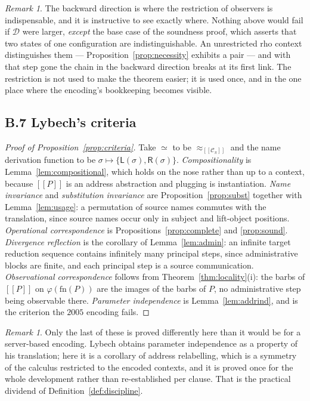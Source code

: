 \documentclass[11pt]{article}
\theoremstyle{definition}
\theoremstyle{plain}
\theoremstyle{remark}
\newtheorem{remark}[definition]{Remark}
\newcommand{\enc}[1]{[\![#1]\!]}
\newcommand{\Lft}{\mathsf{L}}
\newcommand{\Rgt}{\mathsf{R}}
\newcommand{\Ctx}{\mathscr{C}}
\newcommand{\Obs}{\mathcal{D}}
\newcommand{\bisim}{\approx}
\newcommand{\fn}{\mathrm{fn}}
\begin{document}
\begin{remark}
The backward direction is where the restriction of observers is
indispensable, and it is instructive to see exactly where. Nothing above
would fail if $\Obs$ were larger, \emph{except} the base case of the
soundness proof, which asserts that two states of one configuration are
indistinguishable. An unrestricted rho context distinguishes them ---
Proposition~\ref{prop:necessity} exhibits a pair --- and with that step
gone the chain in the backward direction breaks at its first link. The
restriction is not used to make the theorem easier; it is used once, and
in the one place where the encoding's bookkeeping becomes visible.
\end{remark}

\subsection{B.7 Lybech's criteria}

\begin{proof}[Proof of Proposition~\ref{prop:criteria}]
Take $\simeq$ to be $\bisim_{\enc{\Ctx_\pi}}$ and the name derivation
function to be $\sigma \mapsto \{\Lft(\sigma),\Rgt(\sigma)\}$.
\emph{Compositionality} is Lemma~\ref{lem:compositional}, which holds on
the nose rather than up to a context, because $\enc{P}$ is an address
abstraction and plugging is instantiation.
\emph{Name invariance} and \emph{substitution invariance} are
Proposition~\ref{prop:subst} together with Lemma~\ref{lem:usage}: a
permutation of source names commutes with the translation, since source
names occur only in subject and lift-object positions.
\emph{Operational correspondence} is
Propositions~\ref{prop:complete} and \ref{prop:sound}.
\emph{Divergence reflection} is the corollary of
Lemma~\ref{lem:admin}: an infinite target reduction sequence contains
infinitely many principal steps, since administrative blocks are finite,
and each principal step is a source communication.
\emph{Observational correspondence} follows from
Theorem~\ref{thm:locality}(i): the barbs of $\enc{P}$ on
$\varphi(\fn(P))$ are the images of the barbs of $P$, no administrative
step being observable there.
\emph{Parameter independence} is Lemma~\ref{lem:addrind}, and is the
criterion the $2005$ encoding fails.
\end{proof}

\begin{remark}
Only the last of these is proved differently here than it would be for a
server-based encoding. Lybech obtains parameter independence as a
property of his translation; here it is a corollary of address
relabelling, which is a symmetry of the calculus restricted to the
encoded contexts, and it is proved once for the whole development rather
than re-established per clause. That is the practical dividend of
Definition~\ref{def:discipline}.
\end{remark}
\end{document}
